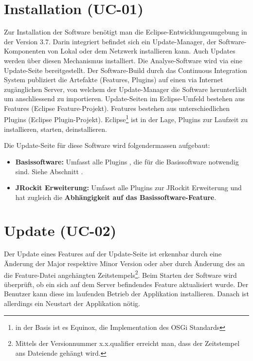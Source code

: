 \section{Installation (UC-01)}\label{installation}
Zur Installation der Software benötigt man die Eclipse-Entwicklungsumgebung in der Version 3.7. Darin integriert befindet sich ein Update-Manager, der Software-Komponenten von Lokal oder dem Netzwerk installieren kann. Auch Updates werden über diesen Mechanismus installiert. Die Analyse-Software wird via eine Update-Seite bereitgestellt. Der Software-Build durch das Continuous Integration System publiziert die Artefakte (Features, Plugins) auf einen via Internet zugänglichen Server, von welchem der Update-Manager die Software herunterlädt um anschliessend zu importieren. Update-Seiten im Eclipse-Umfeld bestehen aus Features (Eclipse Feature-Projekt). Features bestehen aus unterschiedlichen Plugins (Eclipse Plugin-Projekt). Eclipse\footnote{in der Basis ist es Equinox, die Implementation des OSGi Standards} ist in der Lage, Plugins zur Laufzeit zu installieren, starten, deinstallieren.

Die Update-Seite für diese Software wird folgendermassen aufgebaut:
\begin{itemize}
\item \textbf{Basissoftware:} Umfasst alle Plugins , die für die Basissoftware notwendig sind. Siehe Abschnitt .
\item \textbf{JRockit Erweiterung: }Umfasst alle Plugins zur JRockit Erweiterung und hat zugleich die \textbf{Abhängigkeit auf das Basissoftware-Feature}.
\end{itemize}

\section{Update (UC-02)}
Der Update eines Features auf der Update-Seite ist erkennbar durch eine Änderung der Major respektive Minor Version oder aber durch Änderung des an die Feature-Datei angehängten Zeitstempels\footnote{Mittels der Versionnummer x.x.qualifier erreicht man, dass der Zeitstempel ans Dateiende gehängt wird.}. Beim Starten der Software wird überprüft, ob ein sich auf dem Server befindendes Feature aktualisiert wurde. Der Benutzer kann diese im laufenden Betrieb der Applikation installieren. Danach ist allerdings ein Neustart der Applikation nötig. 

